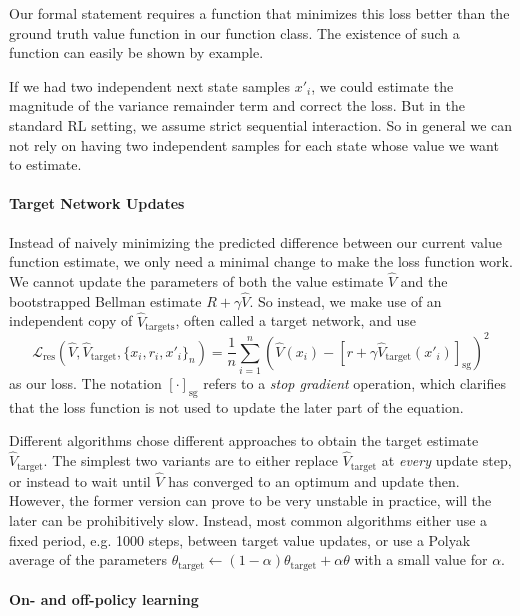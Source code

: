 Our formal statement requires a function that minimizes this loss better than the ground truth value function in our function class.
The existence of such a function can easily be shown by example.

If we had two independent next state samples $x'_i$, we could estimate the magnitude of the variance remainder term and correct the loss.
But in the standard RL setting, we assume strict sequential interaction.
So in general we can not rely on having two independent samples for each state whose value we want to estimate.

\paragraph{Target Network Updates}

Instead of naively minimizing the predicted difference between our current value function estimate, we only need a minimal change to make the loss function work.
We cannot update the parameters of both the value estimate $\hat{V}$ and the bootstrapped Bellman estimate $R + \gamma \hat{V}$.
So instead, we make use of an independent copy of $\hat{V}_\mathrm{targets}$, often called a target network, and use
\[
    \mathcal{L}_\mathrm{res}\left(\hat{V}, \hat{V}_\mathrm{target}, \{x_i, r_i, x'_i\}_{n}\right) = \frac{1}{n} \sum_{i=1}^n \left(\hat{V}(x_i) - \left[r + \gamma \hat{V}_\mathrm{target}(x'_i)\right]_\mathrm{sg}\right)^2
\]
as our loss.
The notation $[\cdot]_\mathrm{sg}$ refers to a \emph{stop gradient} operation, which clarifies that the loss function is not used to update the later part of the equation.

Different algorithms chose different approaches to obtain the target estimate $\hat{V}_\mathrm{target}$.
The simplest two variants are to either replace $\hat{V}_\mathrm{target}$ at \emph{every} update step, or instead to wait until $\hat{V}$ has converged to an optimum and update then.
However, the former version can prove to be very unstable in practice, will the later can be prohibitively slow.
Instead, most common algorithms either use a fixed period, e.g. 1000 steps, between target value updates, or use a Polyak average of the parameters $\theta_\mathrm{target} \leftarrow (1 - \alpha) \theta_\mathrm{target} + \alpha \theta$ with a small value for $\alpha$.

\paragraph{On- and off-policy learning}

